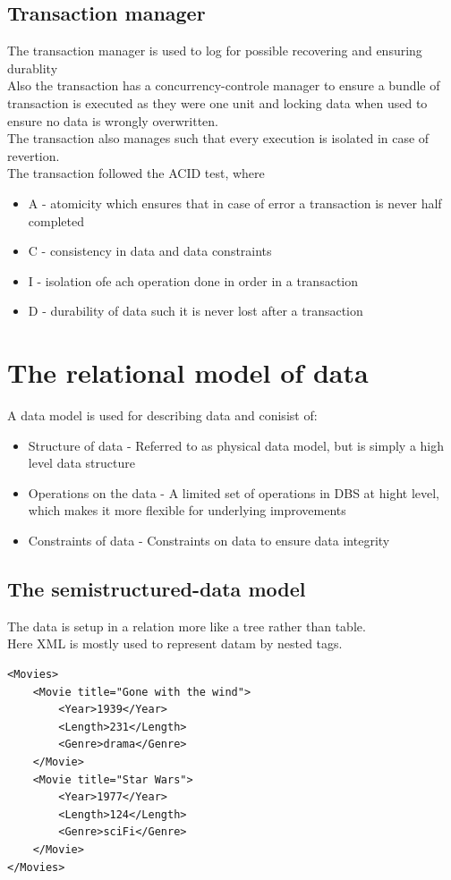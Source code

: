 \documentclass[12pt, a4paper]{article}
\begin{document}
				\subsection{Transaction manager}
					The transaction manager is used to log for possible recovering and ensuring durablity\\
					Also the transaction has a concurrency-controle manager to ensure a bundle of transaction is executed as they were one unit and locking data when used to ensure no data is wrongly overwritten.\\
					The transaction also manages such that every execution is isolated in case of revertion.\\
					The transaction followed the ACID test, where
					\begin{itemize}
						\item A - atomicity which ensures that in case of error a transaction is never half completed
						\item C - consistency in data and data constraints
						\item I - isolation ofe ach operation done in order in a transaction
						\item D - durability of data such it is never lost after a transaction
					\end{itemize}
	\section{The relational model of data}
		A data model is used for describing data and conisist of:
		\begin{itemize}
			\item Structure of data - Referred to as physical data model, but is simply a high level data structure
			\item Operations on the data - A limited set of operations in DBS at hight level, which makes it more flexible for underlying improvements
			\item Constraints of data - Constraints on data to ensure data integrity
		\end{itemize} 
		\subsection{The semistructured-data model}
			The data is setup in a relation more like a tree rather than table.\\
			Here XML is mostly used to represent datam by nested tags.
			\begin{lstlisting}
<Movies>
	<Movie title="Gone with the wind">
		<Year>1939</Year>
		<Length>231</Length>
		<Genre>drama</Genre>
	</Movie>
	<Movie title="Star Wars">
		<Year>1977</Year>
		<Length>124</Length>
		<Genre>sciFi</Genre>
	</Movie>
</Movies>
			\end{lstlisting}
\end{document}

